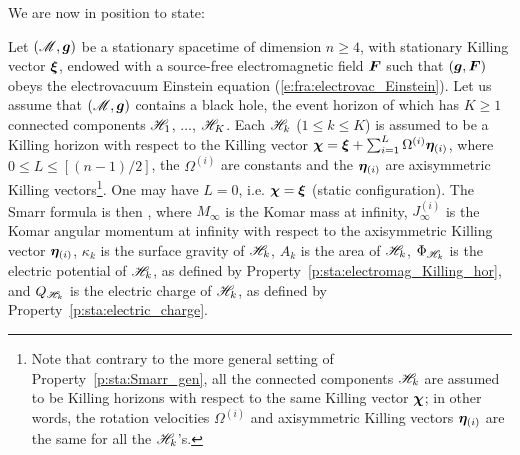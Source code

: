 We are now in position to state:

\begin{prop}
Let $(\mathscr{M},\bm{g})$ be a stationary spacetime of dimension $n\geq 4$, with stationary
Killing vector $\bm{\xi}$, endowed with a source-free electromagnetic field
$\bm{F}$ such that $(\bm{g},\bm{F})$ obeys the electrovacuum Einstein equation
(\ref{e:fra:electrovac_Einstein}).
Let us assume that $(\mathscr{M},\bm{g})$ contains a black
hole, the event horizon of which has $K \geq 1$ connected components
$\mathscr{H}_{1}$, $\ldots$, $\mathscr{H}_{K}$. Each $\mathscr{H}_{k}$ ($1\leq k \leq K$)
is assumed to be a Killing horizon with respect to the Killing vector
$\bm{\chi} = \bm{\xi} + \sum_{i=1}^{L} \Omega^{(i)} \bm{\eta}_{(i)}$,
where $0\leq L \leq [(n-1)/2]$, the $\Omega^{(i)}$ are constants and
the $\bm{\eta}_{(i)}$ are axisymmetric Killing vectors\footnote{Note that contrary to the more
general setting of Property~\ref{p:sta:Smarr_gen},
all the connected components $\mathscr{H}_k$ are assumed to be Killing horizons with
respect to the same Killing vector $\bm{\chi}$; in other words, the
rotation velocities
$\Omega^{(i)}$ and axisymmetric Killing vectors $\bm{\eta}_{(i)}$
are the same for all the $\mathscr{H}_k$'s.}. One may have $L=0$,
i.e. $\bm{\chi} = \bm{\xi}$ (static configuration).
The Smarr formula is then
\be \label{e:sta:Smarr_electrovac}
    ,
\ee
where $M_\infty$ is the Komar mass at infinity,
$J_\infty^{(i)}$ is the Komar angular momentum at infinity with respect
to the axisymmetric Killing vector $\bm{\eta}_{(i)}$, $\kappa_k$ is the
surface gravity of $\mathscr{H}_k$, $A_k$ is the area of $\mathscr{H}_k$,
$\Phi_{\mathscr{H}_k}$ is the electric potential of $\mathscr{H}_k$, as defined by
Property~\ref{p:sta:electromag_Killing_hor}, and $Q_{\mathscr{H}_k}$ is the
electric charge of $\mathscr{H}_k$, as defined by Property~\ref{p:sta:electric_charge}.
\end{prop}

